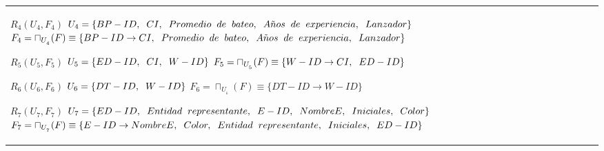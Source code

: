 \documentclass{report}
\begin{document}
\begin{tabularx}{\textwidth}{|X|}
        $ R_{4} ( U_{4} , F_{4} ) $ \newline 
        $ U_{4} = \{{BP-ID, \hspace{0.2cm}  CI, \hspace{0.2cm}  Promedio \hspace{0.2cm} de \hspace{0.2cm} bateo, \hspace{0.2cm}  A\tilde{n}os \hspace{0.2cm} de \hspace{0.2cm} experiencia, \hspace{0.2cm}  Lanzador}\} $ \newline 
        $ F_{4} = \sqcap_{U_{_{4}}}(F) \equiv \{BP-ID \rightarrow CI, \hspace{0.2cm} Promedio \hspace{0.2cm} de \hspace{0.2cm} bateo, \hspace{0.2cm} A\tilde{n}os \hspace{0.2cm} de \hspace{0.2cm} experiencia, \hspace{0.2cm} Lanzador \} $\newline 
        
        $ R_{5} ( U_{5} , F_{5} ) $ \newline 
        $ U_{5} = \{{ED-ID, \hspace{0.2cm}  CI, \hspace{0.2cm}  W-ID}\} $ \newline 
        $ F_{5} = \sqcap_{U_{_{5}}}(F) \equiv \{W-ID \rightarrow CI, \hspace{0.2cm} ED-ID \} $\newline 
        
        $ R_{6} ( U_{6} , F_{6} ) $ \newline 
        $ U_{6} = \{{DT-ID, \hspace{0.2cm}  W-ID}\} $ \newline 
        $ F_{6} = \sqcap_{U_{_{6}}}(F) \equiv \{DT-ID \rightarrow W-ID \} $\newline 
        
        $ R_{7} ( U_{7} , F_{7} ) $ \newline 
        $ U_{7} = \{{ED-ID, \hspace{0.2cm}  Entidad \hspace{0.2cm} representante, \hspace{0.2cm}  E-ID, \hspace{0.2cm}  NombreE, \hspace{0.2cm}  Iniciales, \hspace{0.2cm}  Color}\} $ \newline 
        $ F_{7} = \sqcap_{U_{_{7}}}(F) \equiv \{E-ID \rightarrow NombreE, \hspace{0.2cm} Color, \hspace{0.2cm} Entidad \hspace{0.2cm} representante, \hspace{0.2cm} Iniciales, \hspace{0.2cm} ED-ID \} $\newline 
        

\end{tabularx}
\end{document}
